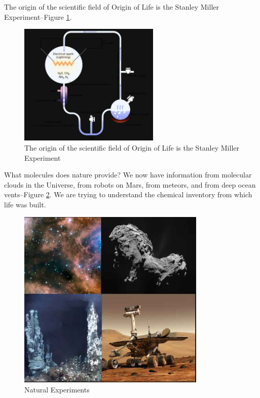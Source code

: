 \documentclass[]{article}
\begin{document}
The origin of the scientific field of Origin of Life is the Stanley Miller Experiment\cite{ferus2017formation,miller1953production}--Figure \ref{fig:StanleyMillar}.

\begin{figure}[H]
	\begin{center}
		\caption[The Stanley Miller Experiment]{The origin of the scientific field of Origin of Life is the Stanley Miller Experiment}\label{fig:StanleyMillar}
		\includegraphics[width=0.6\textwidth]{StanleyMillar}
	\end{center}
\end{figure}

What molecules does nature provide? We now have information from molecular clouds in the Universe, from robots on Mars, from meteors, and from deep ocean vents--Figure \ref{fig:NaturalExperiments}. We are trying to understand the chemical inventory from which life was built.
\begin{figure}[H]
	\begin{center}
		\caption{Natural Experiments}\label{fig:NaturalExperiments}
		\includegraphics[width=0.8\textwidth]{NaturalExperiments}
	\end{center}
\end{figure}
\end{document}
